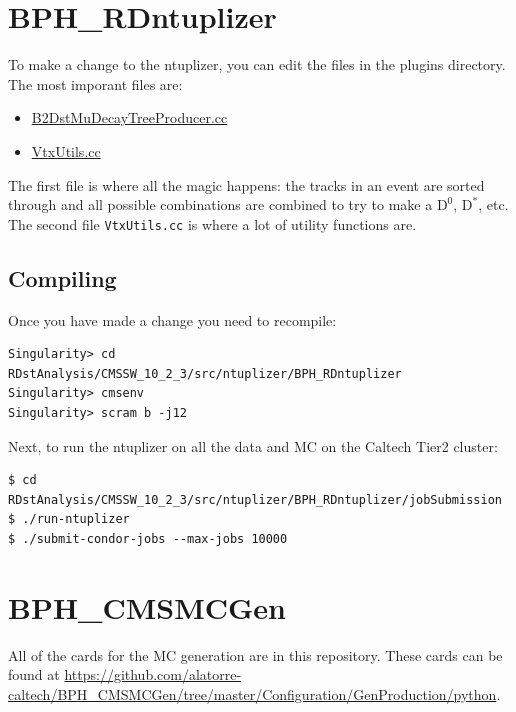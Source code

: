 \documentclass[12pt]{report}
\begin{document}
\section{BPH\_RDntuplizer}
To make a change to the ntuplizer, you can edit the files in the plugins directory. The most imporant files are:
\begin{itemize}
\item \href{https://github.com/alatorre-caltech/BPH_RDntuplizer/blob/master/plugins/B2DstMuDecayTreeProducer.cc}{B2DstMuDecayTreeProducer.cc}
\item \href{https://github.com/alatorre-caltech/BPH_RDntuplizer/blob/master/plugins/VtxUtils.cc}{VtxUtils.cc}
\end{itemize}
The first file is where all the magic happens: the tracks in an event are
sorted through and all possible combinations are combined to try to make a
$\mathrm{D}^0$, $\mathrm{D}^*$, etc. The second file \texttt{VtxUtils.cc} is
where a lot of utility functions are.
\subsection{Compiling}
Once you have made a change you need to recompile:
\begin{mdframed}[backgroundcolor=light-gray, roundcorner=10pt,leftmargin=1, rightmargin=1, innerleftmargin=15, innertopmargin=15,innerbottommargin=15, outerlinewidth=1, linecolor=light-gray,roundcorner=20pt]
\begin{lstlisting}
Singularity> cd RDstAnalysis/CMSSW_10_2_3/src/ntuplizer/BPH_RDntuplizer
Singularity> cmsenv
Singularity> scram b -j12
\end{lstlisting}
\end{mdframed}

Next, to run the ntuplizer on all the data and MC on the Caltech Tier2 cluster:
\begin{mdframed}[backgroundcolor=light-gray, roundcorner=10pt,leftmargin=1, rightmargin=1, innerleftmargin=15, innertopmargin=15,innerbottommargin=15, outerlinewidth=1, linecolor=light-gray,roundcorner=20pt]
\begin{lstlisting}
$ cd RDstAnalysis/CMSSW_10_2_3/src/ntuplizer/BPH_RDntuplizer/jobSubmission
$ ./run-ntuplizer
$ ./submit-condor-jobs --max-jobs 10000
\end{lstlisting}
\end{mdframed}
\section{BPH\_CMSMCGen}
All of the cards for the MC generation are in this repository. These cards can
be found at
\url{https://github.com/alatorre-caltech/BPH_CMSMCGen/tree/master/Configuration/GenProduction/python}.
\end{document}
